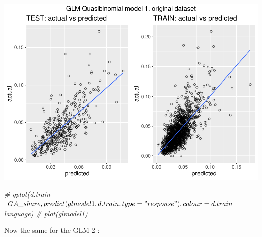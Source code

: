 \documentclass[
]{article}
\newenvironment{Shaded}{\begin{snugshade}}{\end{snugshade}}
\newcommand{\CommentTok}[1]{\textcolor[rgb]{0.56,0.35,0.01}{\textit{#1}}}
\begin{document}
\includegraphics{Lin_Mod_Clus_Analysis_files/figure-latex/unnamed-chunk-32-1.pdf}

\begin{Shaded}
\begin{Highlighting}[]
\CommentTok{\# qplot(d.train$GA\_share, predict(glmodel1, d.train, type="response"), colour = d.train$language)}
\CommentTok{\# plot(glmodel1)}
\end{Highlighting}
\end{Shaded}

Now the same for the GLM 2 :
\end{document}
